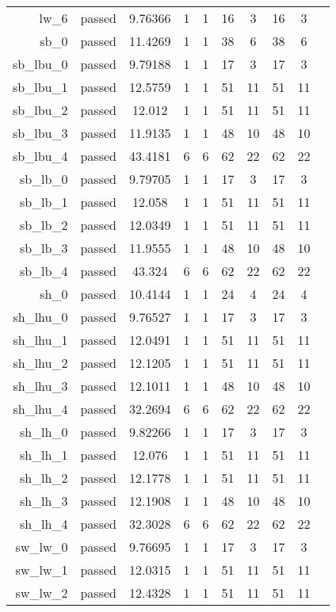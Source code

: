 \begin{longtable}{r|ccccccccc}
    lw\_6 & passed & 9.76366 & 1 & 1 & 16 & 3 & 16 & 3 \\
    sb\_0 & passed & 11.4269 & 1 & 1 & 38 & 6 & 38 & 6 \\
    sb\_lbu\_0 & passed & 9.79188 & 1 & 1 & 17 & 3 & 17 & 3 \\
    sb\_lbu\_1 & passed & 12.5759 & 1 & 1 & 51 & 11 & 51 & 11 \\
    sb\_lbu\_2 & passed & 12.012 & 1 & 1 & 51 & 11 & 51 & 11 \\
    sb\_lbu\_3 & passed & 11.9135 & 1 & 1 & 48 & 10 & 48 & 10 \\
    sb\_lbu\_4 & passed & 43.4181 & 6 & 6 & 62 & 22 & 62 & 22 \\
    sb\_lb\_0 & passed & 9.79705 & 1 & 1 & 17 & 3 & 17 & 3 \\
    sb\_lb\_1 & passed & 12.058 & 1 & 1 & 51 & 11 & 51 & 11 \\
    sb\_lb\_2 & passed & 12.0349 & 1 & 1 & 51 & 11 & 51 & 11 \\
    sb\_lb\_3 & passed & 11.9555 & 1 & 1 & 48 & 10 & 48 & 10 \\
    sb\_lb\_4 & passed & 43.324 & 6 & 6 & 62 & 22 & 62 & 22 \\
    sh\_0 & passed & 10.4144 & 1 & 1 & 24 & 4 & 24 & 4 \\
    sh\_lhu\_0 & passed & 9.76527 & 1 & 1 & 17 & 3 & 17 & 3 \\
    sh\_lhu\_1 & passed & 12.0491 & 1 & 1 & 51 & 11 & 51 & 11 \\
    sh\_lhu\_2 & passed & 12.1205 & 1 & 1 & 51 & 11 & 51 & 11 \\
    sh\_lhu\_3 & passed & 12.1011 & 1 & 1 & 48 & 10 & 48 & 10 \\
    sh\_lhu\_4 & passed & 32.2694 & 6 & 6 & 62 & 22 & 62 & 22 \\
    sh\_lh\_0 & passed & 9.82266 & 1 & 1 & 17 & 3 & 17 & 3 \\
    sh\_lh\_1 & passed & 12.076 & 1 & 1 & 51 & 11 & 51 & 11 \\
    sh\_lh\_2 & passed & 12.1778 & 1 & 1 & 51 & 11 & 51 & 11 \\
    sh\_lh\_3 & passed & 12.1908 & 1 & 1 & 48 & 10 & 48 & 10 \\
    sh\_lh\_4 & passed & 32.3028 & 6 & 6 & 62 & 22 & 62 & 22 \\
    sw\_lw\_0 & passed & 9.76695 & 1 & 1 & 17 & 3 & 17 & 3 \\
    sw\_lw\_1 & passed & 12.0315 & 1 & 1 & 51 & 11 & 51 & 11 \\
    sw\_lw\_2 & passed & 12.4328 & 1 & 1 & 51 & 11 & 51 & 11 \\

\end{longtable}
